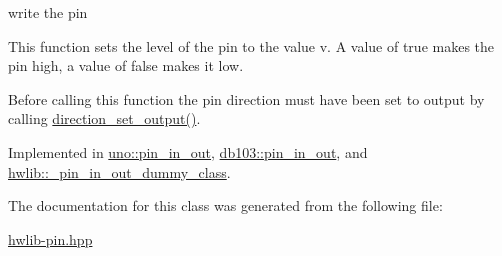 write the pin 

This function sets the level of the pin to the value v. A value of true makes the pin high, a value of false makes it low.

Before calling this function the pin direction must have been set to output by calling \hyperlink{classhwlib_1_1pin__in__out_ad08a5f5e9a4c3aadaa7c665b98f2418e}{direction\+\_\+set\+\_\+output()}. 

Implemented in \hyperlink{classuno_1_1pin__in__out_a54cb255e06318c8fef9f7595c50e3588}{uno\+::pin\+\_\+in\+\_\+out}, \hyperlink{classdb103_1_1pin__in__out_a45fca06e527503565429a278dc0b1322}{db103\+::pin\+\_\+in\+\_\+out}, and \hyperlink{classhwlib_1_1__pin__in__out__dummy__class_afd92206adb4c05526a84d8e7ff17491c}{hwlib\+::\+\_\+pin\+\_\+in\+\_\+out\+\_\+dummy\+\_\+class}.



The documentation for this class was generated from the following file\+:\begin{DoxyCompactItemize}
\item 
\hyperlink{hwlib-pin_8hpp}{hwlib-\/pin.\+hpp}\end{DoxyCompactItemize}
